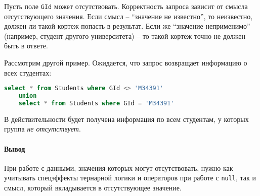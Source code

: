 Пусть поле \texttt{GId} может отсутствовать. Корректность запроса зависит от смысла
отсутствующего значения. Если смысл -- ``значение не известно'', то неизвестно, должен ли такой
кортеж попасть в результат. Если же ``значение неприменимо'' (например, студент другого
университета) -- то такой кортеж точно не должен быть в ответе.

Рассмотрим другой пример. Ожидается, что запрос возвращает информацию о всех студентах:

\begin{lstlisting}[language=SQL]
    select * from Students where GId <> 'M34391'
    union
    select * from Students where GId = 'M34391'
\end{lstlisting}

В действительности будет получена информация по всем студентам, у которых группа
\textit{не отсутствует}.

\paragraph{Вывод}

При работе с данными, значения которых могут отсутствовать, нужно как учитывать спецэффекты
тернарной логики и операторов при работе с \texttt{null}, так и смысл, который
вкладывается в отсутствующее значение.